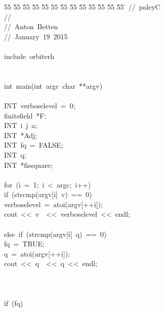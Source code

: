 %
%
\begin{tabbing}
55 \= 55 \= 55 \= 55 \= 55 \= 55 \= 55 \= 55 \= 55 \= 55 \= 55 \= 55 \= 55 \= \kill
//\ paleyC\\[0pt]
//\ \\[0pt]
//\ Anton\ Betten\\[0pt]
//\ January\ 19\ 2015\\[0pt]
\\[0pt]
include\ orbiterh\\[0pt]
\\[0pt]
\\[0pt]
int\ main(int\ argc\ char\ **argv)\\[0pt]
\\[0pt]
\>INT\ verboselevel\ =\ 0;\\[0pt]
\>finitefield\ *F;\\[0pt]
\>INT\ i\ j\ a;\\[0pt]
\>INT\ *Adj;\\[0pt]
\>INT\ fq\ =\ FALSE;\\[0pt]
\>INT\ q;\\[0pt]
\>INT\ *fissquare;\\[0pt]
\\[0pt]
\>for\ (i\ =\ 1;\ i\ <\ argc;\ i++)\ \\[0pt]
\>\>if\ (strcmp(argv[i]\ v)\ ==\ 0)\ \\[0pt]
\>\>\>verboselevel\ =\ atoi(argv[++i]);\\[0pt]
\>\>\>cout\ <<\ v\ \ <<\ verboselevel\ <<\ endl;\\[0pt]
\>\>\>\\[0pt]
\>\>else\ if\ (strcmp(argv[i]\ q)\ ==\ 0)\ \\[0pt]
\>\>\>fq\ =\ TRUE;\\[0pt]
\>\>\>q\ =\ atoi(argv[++i]);\\[0pt]
\>\>\>cout\ <<\ q\ \ <<\ q\ <<\ endl;\\[0pt]
\>\>\>\\[0pt]
\>\>\\[0pt]
\\[0pt]
\>if\ (fq)\ \\[0pt]

\end{tabbing}
